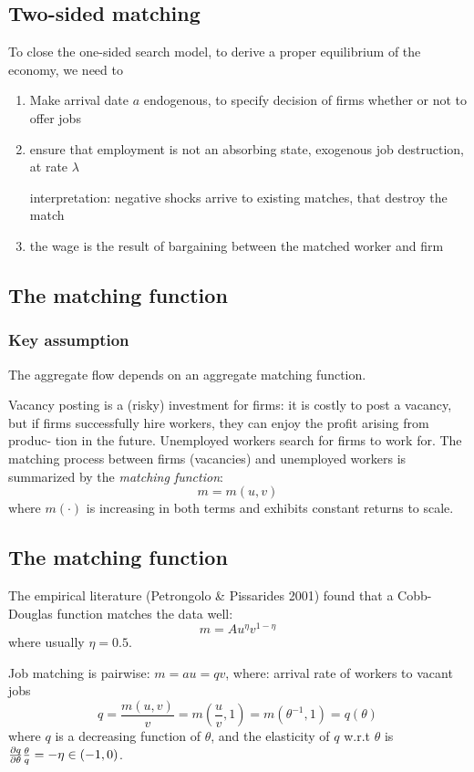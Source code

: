 \subsection{Two-sided matching}
To close the one-sided search model, to derive a proper equilibrium
of the economy, we need to
\begin{enumerate}
    \item Make arrival date $a$ endogenous, to specify decision of firms whether or not to offer jobs
    \item ensure that employment is not an absorbing state, exogenous job destruction, at rate $\lambda$
    
    interpretation: negative shocks arrive to existing matches, that destroy the match
    \item the wage is the result of bargaining between the matched
    worker and firm
\end{enumerate}

\subsection{The matching function}

\subsubsection{Key assumption}
The aggregate flow depends on an aggregate matching function.

Vacancy posting is a (risky) investment for firms: it is costly to post a
vacancy, but if firms successfully hire workers, they can enjoy the profit arising from produc-
tion in the future. Unemployed workers search for firms to work for. The matching process
between firms (vacancies) and unemployed workers is summarized by the \textit{matching function}:
\[m = m(u, v)\]
where $m(\cdot)$ is increasing in both terms and exhibits constant returns to scale.


\subsection{The matching function}
The empirical literature (Petrongolo \& Pissarides 2001) found
that a Cobb-Douglas function matches the data well:
\[m = Au^{\eta}v^{1-\eta} \]
where usually $\eta=0.5$.

Job matching is pairwise: $m = au = qv$, where:
arrival rate of workers to vacant jobs 
\[q = \frac{m(u, v)}{v} = m\left(\frac{u}{v}, 1\right) = m(\theta^{-1}, 1) = q(\theta)\]
where $q$ is a decreasing function of $\theta $, and the elasticity of $q$ w.r.t $\theta $ is $\frac{\partial q}{\partial \theta} \frac{\theta}{q} = -\eta \in (-1,0)$.

